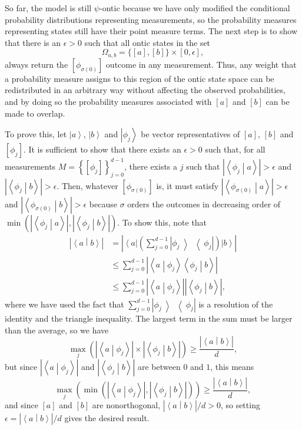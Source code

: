 \documentclass[DIV=calc,fontsize=12pt]{scrartcl} %
\theoremstyle{definition}
\theoremstyle{plain}
\newcommand{\Ket}[1]{\ensuremath{\left \vert #1 \right \rangle}}
\newcommand{\Bra}[1]{\ensuremath{\left \langle #1 \right \vert}}
\newcommand{\BraKet}[2]{\ensuremath{\left \langle #1 \middle \vert #2
\right \rangle}}
\newcommand{\KetBra}[2]{\ensuremath{\left \vert #1 \middle \rangle
\middle \langle #2 \right \vert}}
\newcommand{\Proj}[1]{\ensuremath{\left [ #1 \right ]}}
\begin{document}
So far, the model is still $\psi$-ontic because we have only modified
the conditional probability distributions representing measurements,
so the probability measures representing states still have their point
measure terms.  The next step is to show that there is an $\epsilon >
0$ such that all ontic states in the set
\begin{equation}
\Omega_{a,b} = \{\Proj{a},\Proj{b}\} \times [0,\epsilon],
\end{equation}
always return the $\Proj{\phi_{\sigma(0)}}$ outcome in any
measurement.  Thus, any weight that a probability measure assigns to
this region of the ontic state space can be redistributed in an
arbitrary way without affecting the observed probabilities, and by
doing so the probability measures associated with $\Proj{a}$ and
$\Proj{b}$ can be made to overlap.

To prove this, let $\Ket{a}$, $\Ket{b}$ and $\Ket{\phi_j}$ be vector
representatives of $\Proj{a}$, $\Proj{b}$ and $\Proj{\phi_j}$.  It is
sufficient to show that there exists an $\epsilon > 0$ such that, for
all measurements $M = \left \{ \Proj{\phi_j}\right \}_{j=0}^{d-1}$, there
exists a $j$ such that $\left | \BraKet{\phi_j}{a}\right | > \epsilon$
and $\left | \BraKet{\phi_j}{b}\right | > \epsilon$.  Then, whatever
$\Proj{\phi_{\sigma(0)}}$ is, it must satisfy $\left |
\BraKet{\phi_{\sigma(0)}}{a}\right | > \epsilon$ and $\left |
\BraKet{\phi_{\sigma(0)}}{b}\right | > \epsilon$ because $\sigma$
orders the outcomes in decreasing order of $\min \left ( \left |
\BraKet{\phi_j}{a}\right |, \left | \BraKet{\phi_j}{b}\right |
\right )$.  To show this, note that
\begin{align}
\left | \BraKet{a}{b} \right | & = \left |
\Bra{a} \left ( \sum_{j=0}^{d-1} \KetBra{\phi_j}{\phi_j} \right )
\Ket{b} \right | \\
& \leq \sum_{j=0}^{d-1} \left | \BraKet{a}{\phi_j}\BraKet{\phi_j}{b}
\right | \\
& \leq \sum_{j=0}^{d-1} \left | \BraKet{a}{\phi_j} \right | \left |
\BraKet{\phi_j}{b} \right |,
\end{align}
where we have used the fact that $\sum_{j=0}^{d-1}
\KetBra{\phi_j}{\phi_j}$ is a resolution of the identity and the
triangle inequality.  The largest term in the sum must be larger than
the average, so we have
\begin{equation}
\max_j  \left ( \left | \BraKet{a}{\phi_j} \right | \times \left |
\BraKet{\phi_j}{b} \right |\right ) \geq \frac{\left | \BraKet{a}{b}
\right |}{d},
\end{equation}
but since $\left | \BraKet{a}{\phi_j} \right |$ and $\left |
\BraKet{\phi_j}{b} \right |$ are between $0$ and $1$, this means
\begin{equation}
\max_j  \left ( \min \left ( \left | \BraKet{a}{\phi_j} \right |, \left |
\BraKet{\phi_j}{b} \right | \right ) \right ) \geq \frac{\left |
\BraKet{a}{b} \right |}{d},
\end{equation}
and since $\Proj{a}$ and $\Proj{b}$ are nonorthogonal, $\left |
\BraKet{a}{b} \right |/d > 0$, so setting $\epsilon = \left |
\BraKet{a}{b} \right |/d$ gives the desired result.
\end{document}
